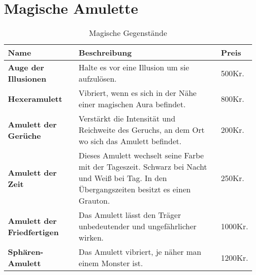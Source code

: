 \section{Magische Amulette}
\begin{table}[H]
\begin{center}
\begin{tabular}{|p{4cm}|p{10cm}|p{1cm}|}
\hline
\textbf{Name} & \textbf{Beschreibung} & \textbf{Preis} \\

\hline
\textbf{Auge der Illusionen} & Halte es vor eine Illusion um sie aufzulösen. & 500Kr. \\

\hline
\textbf{Hexeramulett} & Vibriert, wenn es sich in der Nähe einer magischen Aura befindet. & 800Kr. \\

\hline
\textbf{Amulett der Gerüche} & Verstärkt die Intensität und Reichweite des Geruchs, an dem Ort wo sich das Amulett befindet. & 200Kr. \\ 

\hline
\textbf{Amulett der Zeit} & Dieses Amulett wechselt seine Farbe mit der Tageszeit. Schwarz bei Nacht und Weiß bei Tag. In den Übergangszeiten besitzt es einen Grauton. & 250Kr. \\

\hline
\textbf{Amulett der Friedfertigen} & Das Amulett lässt den Träger unbedeutender und ungefährlicher wirken. & 1000Kr. \\ 

\hline
\textbf{Sphären-Amulett} & Das Amulett vibriert, je näher man einem Monster ist. & 1200Kr. \\

\hline
\end{tabular}
\end{center}
\caption{Magische Gegenstände}
\label{tab:MagischeGegenstände}
\end{table}